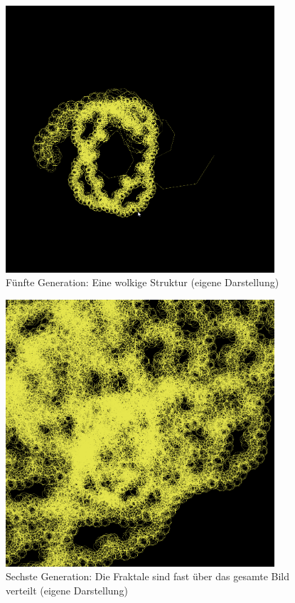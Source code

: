 \documentclass[../mciAusarbeitung.tex]{subfiles}
\begin{document}
\begin{figure}[H]
\includegraphics[width=10cm]{img/fractal-gen5.png}
\caption{Fünfte Generation: Eine wolkige Struktur (eigene Darstellung)}
\label{fractal-gen5}
\end{figure}

\begin{figure}[H]
\includegraphics[width=10cm]{img/fractal-gen6.png}
\caption{Sechste Generation: Die Fraktale sind fast über das gesamte Bild verteilt (eigene Darstellung)}
\label{fractal-gen6}
\end{figure}
\end{document}
